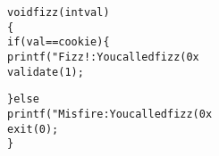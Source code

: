 \begin{alltt}
void fizz(int val)
\verb:{:
    if (val == cookie) \verb:{:
                printf("Fizz!: You called fizz(0x%x)\verb:\n:", val);
                validate(1);

    \verb:}: else
                printf("Misfire: You called fizz(0x%x)\verb:\n:", val);
    exit(0);
\verb:}:
\end{alltt}
